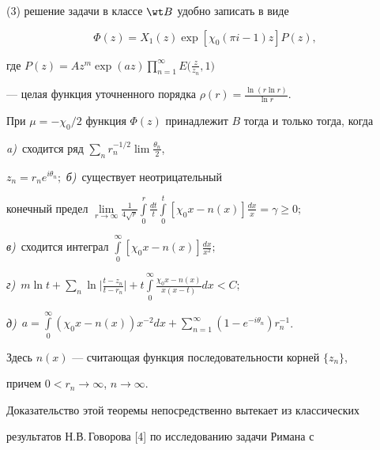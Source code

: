(3) решение задачи в классе $\wt B$ удобно записать в виде 


\begin{equation} 


\Phi(z)=X_1(z)\exp[\chi_0(\pi i-1)z]P(z), 


\end{equation} 


где $P(z)=Az^m\exp(az)\prod\limits^\infty_{n=1}E\big( \frac{z}{z_n},1\big)$ 


--- целая функция уточненного порядка $\rho(r)=\frac{\ln(r\ln r)}{\ln r}$. 


 


 


\begin{thm} 


При $\mu=-\chi_0/2$ функция $\Phi(z)$ принадлежит $B$ тогда и только тогда, когда 


{\em a)}~сходится ряд $\sum\limits_n r^{-1/2}_n\lim \frac{\theta_n}{2}$, 


$z_n=r_n e^{i\theta_n};$ {\em б)}~существует неотрицательный 


конечный предел $\lim\limits_{r\to\infty}\frac{1}{4\sqrt{r}} 


\int\limits^r_0\frac{dt}{t}\int\limits^t_0[\chi_0x-n(x)]\frac{dx}{x}


=\gamma\ge0;$ 


{\em в)}~сходится интеграл $\int\limits^\infty_0[\chi_0x-n(x)] 


\frac{dx}{x^2};$ 


{\em г)}~$m\ln t+\sum\limits_n\ln\big| \frac{t-z_n}{t-r_n}\big|+t 


\int\limits^\infty_0\frac{\chi_0x-n(x)}{x(x-t)}dx<C;$ 


{\em д)}~$a=\int\limits^\infty_0(\chi_0x-n(x))x^{-2}dx+ 


\sum\limits^\infty_{n=1}(1-e^{-i\theta_n})r^{-1}_n$. 


Здесь $n(x)$ --- считающая функция последовательности корней $\{z_n\}$, 


причем $0<r_n\to\infty$, $n\to\infty$. 


\end{thm} 


 


 


Доказательство этой теоремы непосредственно вытекает из классических 


результатов Н.В.\,Го\-во\-ро\-ва [4] по исследованию задачи Римана с 


